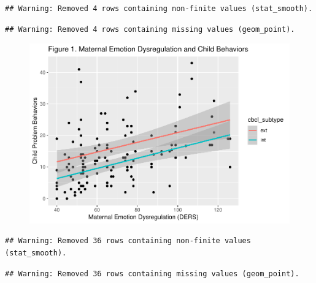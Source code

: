 \documentclass[man]{apa6}
\begin{document}
\begin{verbatim}
## Warning: Removed 4 rows containing non-finite values (stat_smooth).
\end{verbatim}

\begin{verbatim}
## Warning: Removed 4 rows containing missing values (geom_point).
\end{verbatim}

\begin{figure}
\centering
\includegraphics{DataPrepScript_apa_style_files/figure-latex/plots-1.pdf}
\caption{}
\end{figure}

\begin{verbatim}
## Warning: Removed 36 rows containing non-finite values (stat_smooth).
\end{verbatim}

\begin{verbatim}
## Warning: Removed 36 rows containing missing values (geom_point).
\end{verbatim}
\end{document}
